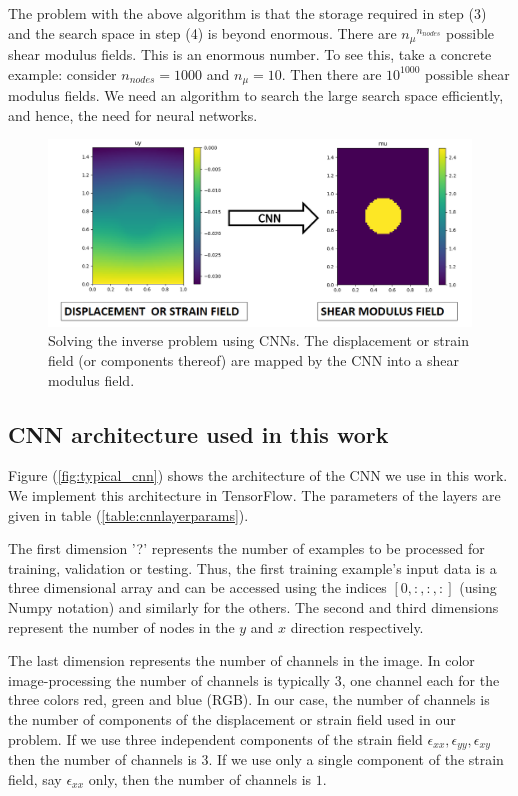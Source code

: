 \documentclass[10pt]{article}
\begin{document}
The problem with the above algorithm is that the storage required in step (3) and the search space in step (4) is beyond enormous. There are ${n_{\mu}}^{n_{nodes}}$ possible shear modulus fields. This is an enormous number. To see this, take a concrete example: consider $n_{nodes}=1000$ and $n_{\mu}=10$. Then there are $10^{1000}$ possible shear modulus fields. We need an algorithm to search the large search space efficiently, and hence, the need for neural networks.
%
\begin{figure}[!h]
   \centering
    \includegraphics[totalheight=5cm]{Figures/schematic_inv/schematic_inv.png}
  \caption{\label{fig:schematic_inv} Solving the inverse problem using CNNs. The displacement or strain field (or components thereof) are mapped by the CNN into a shear modulus field.}
\end{figure}
%
\subsection{\label{sect:cnnarch} CNN architecture used in this work}
Figure (\ref{fig:typical_cnn}) shows the architecture of the CNN we use in this work. We implement this architecture in TensorFlow. The parameters of the layers are given in table (\ref{table:cnnlayerparams}).

The first dimension '?' represents the number of examples to be processed for training, validation or testing. Thus, the first training example's input data is a three dimensional array and can be accessed using the indices $[0,:,:,:]$ (using Numpy \cite{paper:numpy} notation) and similarly for the others. The second and third dimensions represent the number of nodes in the $y$ and $x$ direction respectively.

The last dimension represents the number of channels in the image. In color image-processing the number of channels is typically $3$, one channel each for the three colors red, green and blue (RGB). In our case, the number of channels is the number of components of the displacement or strain field used in our problem. If we use three independent components of the strain field $\epsilon_{xx},\epsilon_{yy},\epsilon_{xy}$ then the number of channels is $3$. If we use only a single component of the strain field, say $\epsilon_{xx}$ only, then the number of channels is $1$.
\end{document}
